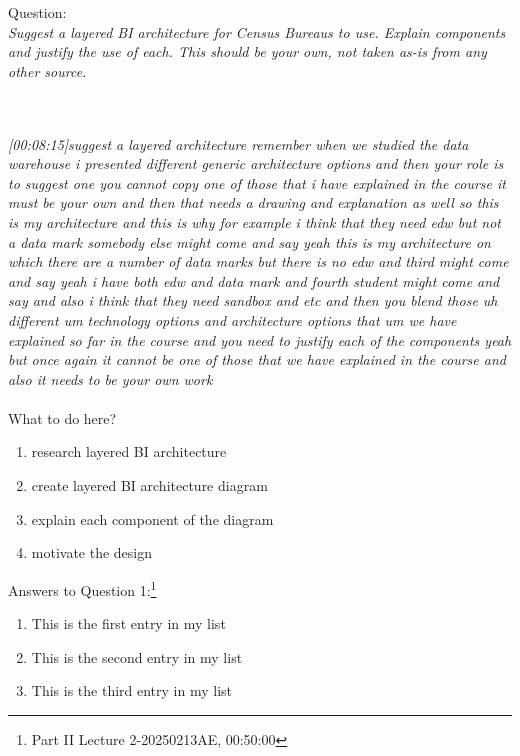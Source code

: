 Question\cite{CourseLitt}:\\
\emph{Suggest a layered BI architecture for Census Bureaus to use. Explain components and
justify the use of each. This should be your own, not taken as-is from any other source.}

\\\\
\emph{[00:08:15]suggest a layered architecture remember when we studied the data warehouse i presented
different generic architecture options and then your role is to suggest one you cannot copy one of those that i have explained in the course it must be your own
and then that needs a drawing and explanation as well so this is my architecture and this is why for example
i think that they need edw but not a data mark somebody else might come and say
yeah this is my architecture on which there are a number of data marks but there is no edw and third might come
and say yeah i have both edw and data mark and fourth student might come and say and also i think that they need sandbox and etc and then you blend those
uh different um technology options and architecture options that um we have explained so far in the course and you need to justify each of the components
yeah but once again it cannot be one of those that we have explained in the course and also it needs to be your own work}\\\\
What to do here?
\begin{enumerate}
    \item research layered BI architecture
    \item create layered BI architecture diagram
    \item explain each component of the diagram
    \item motivate the design
  \end{enumerate}

\newpage Answers to Question 1:\footnote{Part II Lecture 2-20250213AE, 00:50:00}

\newpage 
\begin{enumerate}
  \item This is the first entry in my list
  \item This is the second entry in my list
  \item This is the third entry in my list
\end{enumerate}

